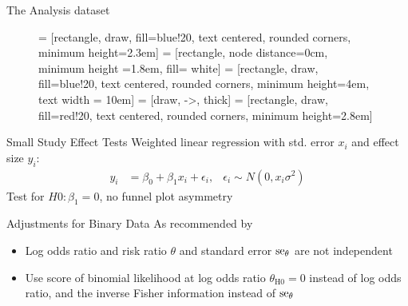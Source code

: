\documentclass[english]{beamer}\usepackage[]{graphicx}\usepackage[]{color}
\begin{document}
\begin{frame}{The Analysis dataset}
\footnotesize
\begin{figure}
\begin{center}
 = [rectangle, draw, fill=blue!20, text centered, rounded corners, minimum height=2.3em]
 = [rectangle, node distance=0cm, minimum height =1.8em, fill= white]
 = [rectangle, draw, fill=blue!20, text centered, rounded corners, minimum height=4em, text width = 10em]
 = [draw, ->, thick]
 = [rectangle, draw, fill=red!20, text centered, rounded corners, minimum height=2.8em]


\end{center}
\end{figure}
\end{frame}


\begin{frame}{Small Study Effect Tests}
\vspace{-4mm}
Weighted linear regression with std. error $x_i$ and effect size $y_i$:
\begin{align}
y_i &= \beta_0 + \beta_1 x_i + \epsilon_i, & \epsilon_i \sim N(0, x_i \sigma^2) \nonumber
\end{align}
Test for $H0: \beta_1 = 0$, no funnel plot asymmetry
\end{frame}

\begin{frame}{Adjustments for Binary Data}
As recommended by \citet{Sterne}
\begin{itemize}
\item Log odds ratio and risk ratio $\theta$ and standard error $\operatorname{se}_\theta$ are not independent
\item Use score of binomial likelihood at log odds ratio $\theta_{\textrm{H0}} = 0$ instead of 
log odds ratio, and the inverse Fisher information instead of $\operatorname{se}_\theta$
\end{itemize}
\end{frame}
\end{document}
